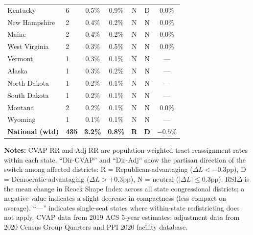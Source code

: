\begin{longtable}{llccccc}
Kentucky & 6 & 0.5\% & 0.9\% & N & D & $0.0\%$ \\
New Hampshire & 2 & 0.4\% & 0.2\% & N & N & $0.0\%$ \\
Maine & 2 & 0.4\% & 0.2\% & N & N & $0.0\%$ \\
West Virginia & 2 & 0.3\% & 0.5\% & N & N & $0.0\%$ \\
Vermont & 1 & 0.3\% & 0.1\% & N & N & --- \\
Alaska & 1 & 0.3\% & 0.2\% & N & N & --- \\
North Dakota & 1 & 0.2\% & 0.1\% & N & N & --- \\
South Dakota & 1 & 0.2\% & 0.1\% & N & N & --- \\
Montana & 2 & 0.2\% & 0.1\% & N & N & $0.0\%$ \\
Wyoming & 1 & 0.1\% & 0.1\% & N & N & --- \\
\midrule
\textbf{National (wtd)} & \textbf{435} & \textbf{3.2\%} & \textbf{0.8\%} & \textbf{R} & \textbf{D} & \textbf{$-0.5\%$} \\
\end{longtable}

\noindent\textbf{Notes:} CVAP RR and Adj RR are population-weighted tract reassignment rates within each state. ``Dir-CVAP'' and ``Dir-Adj'' show the partisan direction of the switch among affected districts: R = Republican-advantaging ($\Delta L < -0.3$pp), D = Democratic-advantaging ($\Delta L > +0.3$pp), N = neutral ($|\Delta L| \leq 0.3$pp). RSI$\Delta$ is the mean change in Reock Shape Index across all state congressional districts; a negative value indicates a slight decrease in compactness (less compact on average). ``---'' indicates single-seat states where within-state redistricting does not apply. CVAP data from 2019 ACS 5-year estimates; adjustment data from 2020 Census Group Quarters and PPI 2020 facility database.

